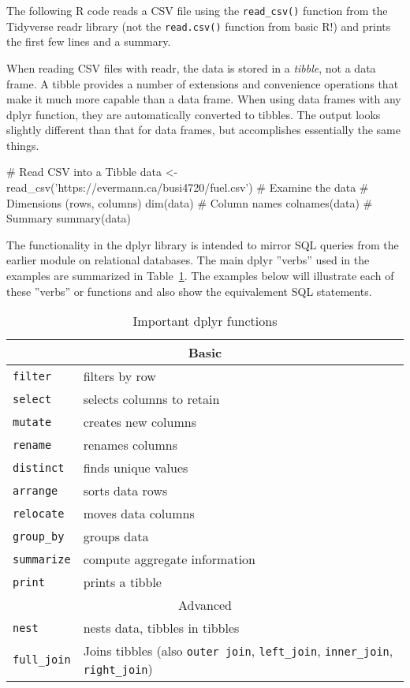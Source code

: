 The following R code reads a CSV file using the \texttt{read\_csv()} function from the Tidyverse readr library (not the \texttt{read.csv()} function from basic R!) and prints the first few lines and a summary. 

When reading CSV files with readr, the data is stored in a \emph{tibble}, not a data frame. A tibble provides a number of extensions and convenience operations that make it much more capable than a data frame. When using data frames with any dplyr function, they are automatically converted to tibbles. The output looks slightly different than that for data frames, but accomplishes essentially the same things.

\begin{Rcode}
# Read CSV into a Tibble
data <- read_csv('https://evermann.ca/busi4720/fuel.csv')
# Examine the data
# Dimensions (rows, columns)
dim(data)
# Column names
colnames(data)
# Summary
summary(data)
\end{Rcode}

The functionality in the dplyr library is intended to mirror SQL queries from the earlier module on relational databases. The main dplyr ''verbs'' used in the examples are summarized in Table~\ref{tab:dplyr}. The examples below will illustrate each of these ''verbs'' or functions and also show the equivalement SQL statements. 

\begin{table}
\centering
\renewcommand{\arraystretch}{1.25}

\begin{tabularx}{\textwidth}{l|X} \hline
\multicolumn{2}{c}{Basic} \\ \hline
\texttt{filter} & filters by row \\
\texttt{select} & selects columns to retain \\
\texttt{mutate} & creates new columns \\
\texttt{rename} & renames columns \\
\texttt{distinct} & finds unique values \\
\texttt{arrange} & sorts data rows \\
\texttt{relocate} & moves data columns \\
\texttt{group\_by} & groups data \\
\texttt{summarize} & compute aggregate information \\
\texttt{print} & prints a tibble \\  \hline
\multicolumn{2}{c}{Advanced} \\ \hline
\texttt{nest} & nests data, tibbles in tibbles \\
\texttt{full\_join} & Joins tibbles (also \texttt{outer join}, \texttt{left\_join}, \texttt{inner\_join}, \texttt{right\_join}) \\ \hline
\end{tabularx}
\caption{Important dplyr functions}
\label{tab:dplyr}
\end{table}

